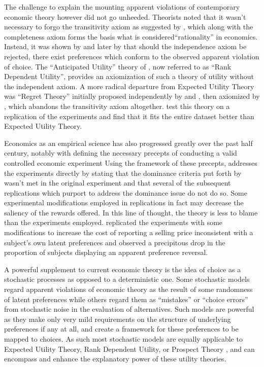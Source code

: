 \documentclass[../main.tex]{subfiles}
\begin{document}
The challenge to explain the mounting apparent violations of contemporary economic theory however did not go unheeded.
Theorists noted that it wasn't necessary to forgo the transitivity axiom as suggested by \textcite[623]{Grether1979}, which along with the completeness axiom forms the basis what is considered\enquote{rationality} in economics.
Instead, it was shown by \textcite{Holt1986} and later by \textcite{Karni1987} that should the independence axiom be rejected, there exist preferences which conform to the observed apparent violation of choice.
The \enquote{Anticipated Utility} theory of \textcite{Quiggin1982}, now referred to as \enquote{Rank Dependent Utility}, provides an axiomization of such a theory of utility without the independent axiom.
A more radical departure from Expected Utility Theory was \enquote{Regret  Theory} initially proposed independently by \textcite{Bell1982} and \textcite{Loomes1982}, then axiomized by \textcite{Fishburn1987}, which abandons the transitivity axiom altogether.
\textcite{Loomes1989} test this theory on a replication of the \textcite{Grether1979} experiments and find that it fits the entire dataset better than Expected Utility Theory.

Economics as an empirical science has also progressed greatly over the past half century, notably with \textcite{Smith1982} defining the necessary precepts of conducting a valid controlled economic experiment
Using the framework of these precepts, \textcite{Harrison1994} addresses the \textcite{Grether1979} experiments directly by stating that the dominance criteria put forth by \textcite{Smith1982} wasn't met in the original experiment and that several of the subsequent replications which purport to address the dominance issue do not do so.
Some experimental modifications employed in replications in fact may decrease the saliency of the rewards offered.
In this line of thought, the theory is less to blame than the experiments employed.
\textcite[236-239]{Harrison1994} replicated the\textcite{Grether1979} experiments with some modifications to increase the cost of reporting a selling price inconsistent with a subject's own latent preferences and observed a precipitous drop in the proportion of subjects displaying an apparent preference reversal.


A powerful supplement to current economic theory is the idea of choice as a stochastic processes as opposed to a deterministic one.
Some stochastic models regard apparent violations of economic theory as the result of some randomness of latent preferences while others regard them as \enquote{mistakes} or \enquote{choice errors} from stochastic noise in the evaluation of alternatives.
Such models are powerful as they make only very mild requirements on the structure of underlying preferences if any at all, and create a framework for these preferences to be mapped to choices.
As such most stochastic models are equally applicable to Expected Utility Theory, Rank Dependent Utility, or Prospect Theory \parencite{Kahneman1979, Tversky1992}, and can encompass and enhance the explanatory power of these utility theories.
\end{document}
